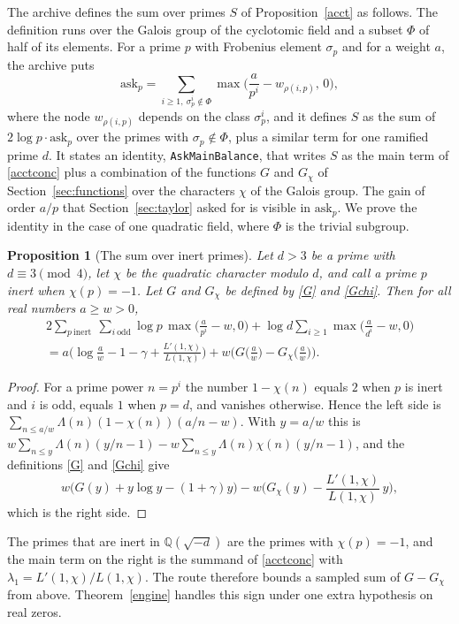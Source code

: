 \documentclass[11pt,letterpaper]{article}
\newtheorem{proposition}[theorem]{Proposition}
\numberwithin{equation}{section}
\begin{document}
The archive defines the sum over primes $S$ of Proposition~\ref{acct} as follows. The definition runs over the Galois group of the cyclotomic field and a subset $\Phi$ of half of its elements. For a prime $p$ with Frobenius element $\sigma_p$ and for a weight $a$, the archive puts
\[
\mathrm{ask}_p=\sum_{i\ge1,\ \sigma_p^i\notin\Phi}\max\Big(\frac a{p^i}-w_{\rho(i,p)},\,0\Big),
\]
where the node $w_{\rho(i,p)}$ depends on the class $\sigma_p^i$, and it defines $S$ as the sum of $2\log p\cdot\mathrm{ask}_p$ over the primes with $\sigma_p\notin\Phi$, plus a similar term for one ramified prime $d$. It states an identity, \texttt{AskMainBalance}, that writes $S$ as the main term of \eqref{acctconc} plus a combination of the functions $G$ and $G_\chi$ of Section~\ref{sec:functions} over the characters $\chi$ of the Galois group. The gain of order $a/p$ that Section~\ref{sec:taylor} asked for is visible in $\mathrm{ask}_p$. We prove the identity in the case of one quadratic field, where $\Phi$ is the trivial subgroup.

\begin{proposition}[The sum over inert primes]\label{inert}
Let $d>3$ be a prime with $d\equiv3\pmod4$, let $\chi$ be the quadratic character modulo $d$, and call a prime $p$ inert when $\chi(p)=-1$. Let $G$ and $G_\chi$ be defined by \eqref{G} and \eqref{Gchi}. Then for all real numbers $a\ge w>0$,
\begin{multline*}
2\sum_{p\ \mathrm{inert}}\ \sum_{i\ \mathrm{odd}}\log p\,\max\Big(\frac a{p^i}-w,0\Big)+\log d\sum_{i\ge1}\max\Big(\frac a{d^i}-w,0\Big)\\
=a\Big(\log\frac aw-1-\gamma+\frac{L'(1,\chi)}{L(1,\chi)}\Big)+w\Big(G\Big(\frac aw\Big)-G_\chi\Big(\frac aw\Big)\Big).
\end{multline*}
\end{proposition}
\begin{proof}
For a prime power $n=p^i$ the number $1-\chi(n)$ equals $2$ when $p$ is inert and $i$ is odd, equals $1$ when $p=d$, and vanishes otherwise. Hence the left side is $\sum_{n\le a/w}\Lambda(n)(1-\chi(n))(a/n-w)$. With $y=a/w$ this is $w\sum_{n\le y}\Lambda(n)(y/n-1)-w\sum_{n\le y}\Lambda(n)\chi(n)(y/n-1)$, and the definitions \eqref{G} and \eqref{Gchi} give
\[
w\Big(G(y)+y\log y-(1+\gamma)y\Big)-w\Big(G_\chi(y)-\frac{L'(1,\chi)}{L(1,\chi)}\,y\Big),
\]
which is the right side.
\end{proof}

The primes that are inert in $\mathbb Q(\sqrt{-d})$ are the primes with $\chi(p)=-1$, and the main term on the right is the summand of \eqref{acctconc} with $\lambda_1=L'(1,\chi)/L(1,\chi)$. The route therefore bounds a sampled sum of $G-G_\chi$ from above. Theorem~\ref{engine} handles this sign under one extra hypothesis on real zeros.
\end{document}

